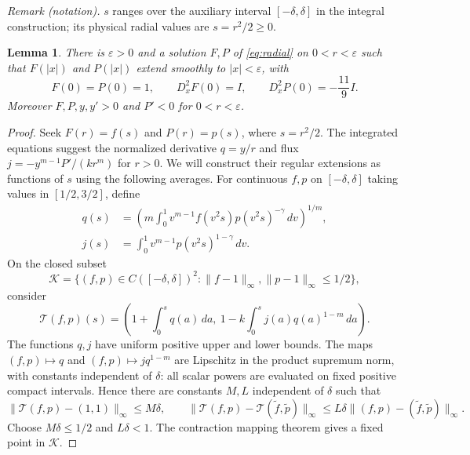 \documentclass[11pt]{article}
\newtheorem{lemma}[theorem]{Lemma}
\theoremstyle{remark}
\begin{document}
\noindent\textit{Remark (notation).} $s$ ranges over the auxiliary interval $[-\delta,\delta]$ in the integral construction; its physical radial values are $s=r^2/2\geq0$.


\begin{lemma}\label{lem:local}
There is $\varepsilon>0$ and a solution $F,P$ of
\eqref{eq:radial} on $0<r<\varepsilon$ such that
$F(|x|)$ and $P(|x|)$ extend smoothly to $|x|<\varepsilon$,
with
\[
 F(0)=P(0)=1,\qquad D_x^2F(0)=I,\qquad
 D_x^2P(0)=-\frac{11}{9}I.
\]
Moreover $F,P,y,y'>0$ and $P'<0$ for $0<r<\varepsilon$.
\end{lemma}
\begin{proof}
Seek $F(r)=f(s)$ and $P(r)=p(s)$, where $s=r^2/2$.
The integrated equations suggest the normalized derivative
$q=y/r$ and flux $j=-y^{m-1}P'/(kr^m)$ for $r>0$.
We will construct their regular extensions as functions of $s$
using the following averages.
For continuous $f,p$ on $[-\delta,\delta]$ taking values in
$[1/2,3/2]$, define
\begin{align}
 q(s)&=\left(m\int_0^1 v^{m-1}
                  f(v^2s)p(v^2s)^{-\gamma}\,dv\right)^{1/m},
                  \label{eq:q}\\
 j(s)&=\int_0^1 v^{m-1}p(v^2s)^{1-\gamma}\,dv.
                  \label{eq:j}
\end{align}
On the closed subset
\[
 \mathcal K=\{(f,p)\in C([-\delta,\delta])^2:
          \|f-1\|_\infty,\|p-1\|_\infty\leq1/2\},
\]
consider
\begin{equation}\label{eq:fixed-point}
 \mathcal T(f,p)(s)=
 \left(1+\int_0^s q(a)\,da,
       \ 1-k\int_0^s j(a)q(a)^{1-m}\,da\right).
\end{equation}
The functions $q,j$ have uniform positive upper and lower bounds.
The maps $(f,p)\mapsto q$ and $(f,p)\mapsto jq^{1-m}$ are
Lipschitz in the product supremum norm, with constants independent
of $\delta$: all scalar powers are evaluated on fixed positive
compact intervals.  Hence there are constants $M,L$ independent
of $\delta$ such that
\[
 \|\mathcal T(f,p)-(1,1)\|_\infty\leq M\delta,
 \qquad
 \|\mathcal T(f,p)-\mathcal T(\widetilde f,\widetilde p)\|_\infty
 \leq L\delta\|(f,p)-(\widetilde f,\widetilde p)\|_\infty.
\]
Choose $M\delta\leq1/2$ and $L\delta<1$.
The contraction mapping theorem gives a fixed point in $\mathcal K$.


\end{proof}
\end{document}
